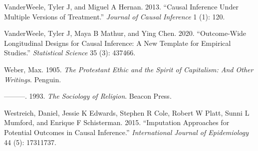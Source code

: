 \documentclass[
  singlecolumn]{report}
\newlength{\cslhangindent}
\newlength{\cslentryspacingunit} %
\newenvironment{CSLReferences}[2] %
 {%
  \setlength{\parindent}{0pt}
  \ifodd #1
  \let\oldpar\par
  \def\par{\hangindent=\cslhangindent\oldpar}
  \fi
  \setlength{\parskip}{#2\cslentryspacingunit}
 }%
 {}
\begin{document}
\begin{CSLReferences}{1}{0}
\leavevmode{}%
VanderWeele, Tyler J, and Miguel A Hernan. 2013. {``Causal Inference
Under Multiple Versions of Treatment.''} \emph{Journal of Causal
Inference} 1 (1): 120.

\leavevmode{}%
VanderWeele, Tyler J, Maya B Mathur, and Ying Chen. 2020.
{``Outcome-Wide Longitudinal Designs for Causal Inference: A New
Template for Empirical Studies.''} \emph{Statistical Science} 35 (3):
437466.

\leavevmode{}%
Weber, Max. 1905. \emph{The Protestant Ethic and the Spirit of
Capitalism: And Other Writings}. Penguin.

\leavevmode{}%
---------. 1993. \emph{The Sociology of Religion}. Beacon Press.

\leavevmode{}%
Westreich, Daniel, Jessie K Edwards, Stephen R Cole, Robert W Platt,
Sunni L Mumford, and Enrique F Schisterman. 2015. {``Imputation
Approaches for Potential Outcomes in Causal Inference.''}
\emph{International Journal of Epidemiology} 44 (5): 17311737.

\end{CSLReferences}
\end{document}
